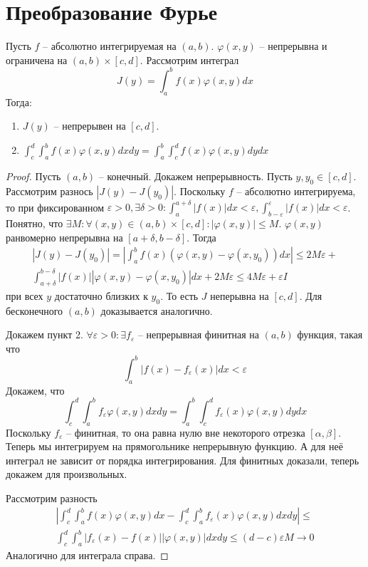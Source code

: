 \documentclass[document.tex]{subfiles}
\begin{document}
\section{Преобразование Фурье}
\begin{lemma}
    Пусть $f$ -- абсолютно интегрируемая на $(a, b)$. $\varphi(x, y)$ -- непрерывна и ограничена на $(a, b) \times [c,
    d]$. Рассмотрим интеграл
    \[
        J(y) = \int_{a}^{b} f(x) \varphi(x, y)dx
    \] Тогда:
    \begin{enumerate}
        \item $J(y)$ -- непрерывен на $[c, d]$.
        \item $\int_{c}^{d} \int_{a}^{b}f(x) \varphi(x, y) dx dy= \int_{a}^{b} \int_{c}^{d} f(x) \varphi(x, y)dydx$
    \end{enumerate}
\end{lemma}

\begin{proof}
    Пусть $(a, b)$ -- конечный.
    Докажем непрерывность. Пусть $y, y_0 \in [c, d]$. Рассмотрим разнось $|J(y) - J(y_0)|$. Поскольку $f$ -- абсолютно
    интегрируема, то при фиксированном $\varepsilon > 0, \exists \delta > 0: \int_{a}^{a + \delta}|f(x)|dx <
    \varepsilon, \int_{b - \varepsilon}^{\varepsilon}|f(x)|dx < \varepsilon$. Понятно, что $\exists M: \forall (x, y)
    \in (a, b) \times [c, d]: |\varphi(x, y)| \leq M$. $\varphi(x, y)$ ранвомерно непрерывна на $[a + \delta, b -
    \delta]$. Тогда
    \begin{multline*}
        |J(y) - J(y_0)| = \left| \int_{a}^{b}f(x) (\varphi(x, y) - \varphi(x, y_0))dx \right| \leq 2M\varepsilon + \\
        \int_{a + \delta}^{b - \delta} |f(x)| |\varphi(x, y) - \varphi(x, y_0)|dx + 2M \varepsilon \leq  4M\varepsilon + 
        \varepsilon I
    \end{multline*} при всех $y$ достаточно близких к $y_0$. То есть $J$ неперывна на $[c, d]$. Для бесконечного $(a,
    b)$ доказывается аналогично.

    Докажем пункт 2. $\forall \varepsilon > 0: \exists f_{\varepsilon}$ -- непрерывная финитная на $(a, b)$ функция,
    такая что
    \[
        \int_{a}^{b}|f(x) - f_{\varepsilon}(x)|dx < \varepsilon
    \]
    Докажем, что
    \[
        \int_{c}^{d} \int_{a}^{b}f_{\varepsilon}\varphi(x, y) dx dy = \int_{a}^{b} \int_{c}^{d}f_{\varepsilon}(x)
        \varphi(x, y) dy dx
    \]
    Поскольку $f_{\varepsilon}$ -- финитная, то она равна нулю вне некоторого отрезка $[\alpha, \beta]$. Теперь мы
    интегрируем на прямогольнике непрерывную функцию. А для неё интеграл не зависит от порядка интегрирования.
    Для финитных доказали, теперь докажем для произвольных.

    Рассмотрим разность 
    \begin{multline*}
        \left|\int_{c}^{d} \int_{a}^{b}f(x) \varphi(x, y)dx - \int_{c}^{d} \int_{a}^{b} f_{\varepsilon}(x) \varphi(x, y) dx dy
        \right| \leq \\ \int_{c}^{d} \int_{a}^{b} |f_{\varepsilon}(x) - f(x)| |\varphi(x, y)|dxdy \leq (d - c) \varepsilon
        M \rightarrow 0
    \end{multline*}
    Аналогично для интеграла справа.
\end{proof}
\end{document}
